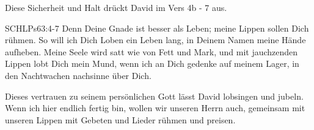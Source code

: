 \documentclass[14pt]{../../inc/mybib}
\begin{document}
    \begin{block}
        Diese Sicherheit und Halt drückt David im Vers 4b - 7 aus.
        \begin{bibelbox}{SCHL}{Ps}{63:4-7}
            Denn Deine Gnade ist besser als Leben; meine Lippen sollen Dich rühmen. So will ich Dich Loben ein Leben lang, in Deinem Namen meine Hände aufheben. Meine Seele wird satt wie von Fett und Mark, und mit jauchzenden Lippen lobt Dich mein Mund, wenn ich an Dich gedenke auf meinem Lager, in den Nachtwachen nachsinne über Dich.
        \end{bibelbox}
        Dieses vertrauen zu seinem persönlichen Gott lässt David lobsingen und jubeln.
        Wenn ich hier endlich fertig bin, wollen wir unseren Herrn auch, gemeinsam mit unseren Lippen mit Gebeten und Lieder rühmen und preisen.
    \end{block}    
\end{document}
